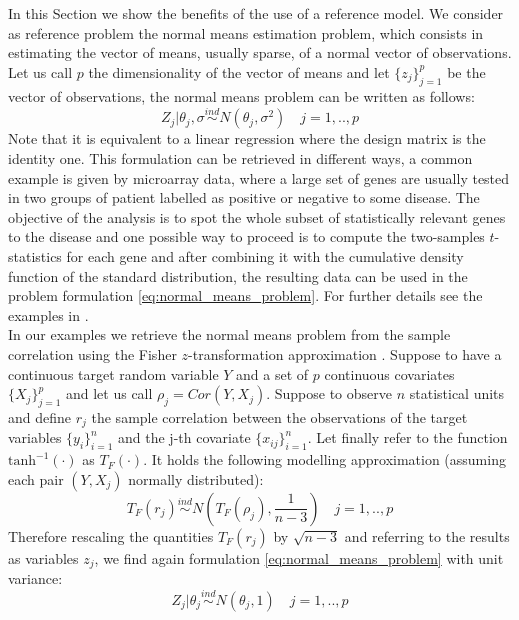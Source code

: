\documentclass[american,]{article}
\theoremstyle{definition}
\begin{document}
In this Section we show the benefits of the use of a reference model. We consider as reference problem the normal means estimation problem, which consists in estimating the vector of means, usually sparse, of a normal vector of observations. Let us call $p$ the dimensionality of the vector of means and let $\{z_{j}\}_{j=1}^{p}$ be the vector of observations, the normal means problem can be written as follows:
\
\begin{equation}\label{eq:normal_means_problem}
Z_{j}|\theta_{j},\sigma\overset{ind}{\sim}N(\theta_{j},\sigma^{2}) \quad j=1,..,p
\end{equation}
Note that it is equivalent to a linear regression where the design matrix is the identity one. This formulation can be retrieved in different ways, a common example is given by microarray data, where a large set of genes are usually tested in two groups of patient labelled as positive or negative to some disease. The objective of the analysis is to spot the whole subset of statistically relevant genes to the disease and one possible way to proceed is to compute the two-samples $t$-statistics for each gene and after combining it with the cumulative density function of the standard distribution, the resulting data can be used in the problem formulation \eqref{eq:normal_means_problem}. For further details see the examples in \cite{paper:efron, book:efron}. 
\\
In our examples we retrieve the normal means problem from the sample correlation using the Fisher $z$-transformation approximation \citep{paper:hawkins}. Suppose to have a continuous target random variable $Y$ and a set of $p$ continuous covariates $\{X_{j}\}_{j=1}^{p}$ and let us call $\rho_{j}=Cor(Y,X_{j})$. Suppose to observe $n$ statistical units and define $r_{j}$ the sample correlation between the observations of the target variables $\{y_{i}\}_{i=1}^{n}$ and the j-th covariate $\{x_{ij}\}_{i=1}^{n}$. Let finally refer to the function $\text{tanh}^{-1}(\cdot)$ as $T_{F}(\cdot)$. It holds the following modelling approximation (assuming each pair $(Y,X_{j})$ normally distributed):
\
\begin{equation} \label{eq:fisher_transformation}
T_{F}(r_{j})\overset{ind}{\sim} N(T_{F}(\rho_{j}),\frac{1}{n-3}) \quad j=1,..,p
\end{equation}
Therefore rescaling the quantities $T_{F}(r_{j})$ by $\sqrt{n-3}$ and referring to the results as variables $z_{j}$, we find again formulation \eqref{eq:normal_means_problem} with unit variance:
\
\begin{equation} \label{eq:normal_means_problem2}
Z_{j}|\theta_{j}\overset{ind}{\sim}N(\theta_{j},1) \quad j=1,..,p
\end{equation}
\end{document}
